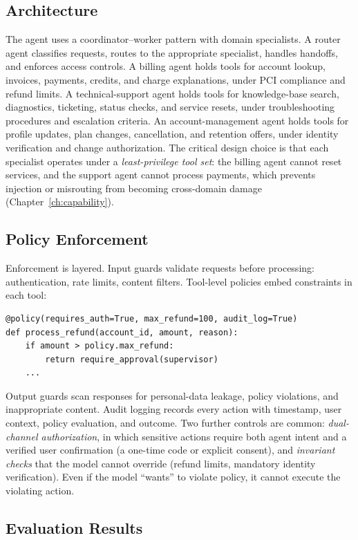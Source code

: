 \documentclass[11pt]{book}
\begin{document}
\subsection{Architecture}

The agent uses a coordinator--worker pattern with domain specialists. A router agent classifies requests, routes to the appropriate specialist, handles handoffs, and enforces access controls. A billing agent holds tools for account lookup, invoices, payments, credits, and charge explanations, under PCI compliance and refund limits. A technical-support agent holds tools for knowledge-base search, diagnostics, ticketing, status checks, and service resets, under troubleshooting procedures and escalation criteria. An account-management agent holds tools for profile updates, plan changes, cancellation, and retention offers, under identity verification and change authorization. The critical design choice is that each specialist operates under a \textit{least-privilege tool set}: the billing agent cannot reset services, and the support agent cannot process payments, which prevents injection or misrouting from becoming cross-domain damage (Chapter~\ref{ch:capability}).

\subsection{Policy Enforcement}

Enforcement is layered. Input guards validate requests before processing: authentication, rate limits, content filters. Tool-level policies embed constraints in each tool:
\begin{verbatim}
@policy(requires_auth=True, max_refund=100, audit_log=True)
def process_refund(account_id, amount, reason):
    if amount > policy.max_refund:
        return require_approval(supervisor)
    ...
\end{verbatim}
Output guards scan responses for personal-data leakage, policy violations, and inappropriate content. Audit logging records every action with timestamp, user context, policy evaluation, and outcome. Two further controls are common: \textit{dual-channel authorization}, in which sensitive actions require both agent intent and a verified user confirmation (a one-time code or explicit consent), and \textit{invariant checks} that the model cannot override (refund limits, mandatory identity verification). Even if the model ``wants'' to violate policy, it cannot execute the violating action.

\subsection{Evaluation Results}
\end{document}
